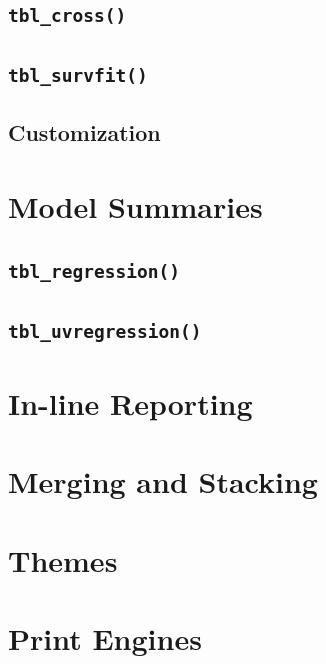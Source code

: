 \subsection{\texorpdfstring{\texttt{tbl\_cross()}}{tbl\_cross()}}

\subsection{\texorpdfstring{\texttt{tbl\_survfit()}}{tbl\_survfit()}}

\subsection{Customization}

\section{Model Summaries}

\subsection{\texorpdfstring{\texttt{tbl\_regression()}}{tbl\_regression()}}

\hypertarget{tbl_uvregression}{%
\subsection{\texorpdfstring{\texttt{tbl\_uvregression()}}{tbl\_uvregression()}}\label{tbl_uvregression}}

\hypertarget{in-line-reporting}{%
\section{In-line Reporting}\label{in-line-reporting}}

\hypertarget{merging-and-stacking}{%
\section{Merging and Stacking}\label{merging-and-stacking}}

\hypertarget{themes}{%
\section{Themes}\label{themes}}

\hypertarget{print-engines}{%
\section{Print Engines}\label{print-engines}}

